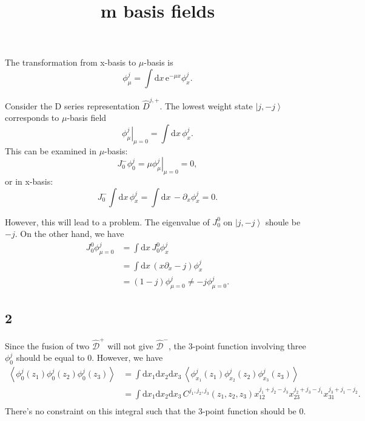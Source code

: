 \documentclass[10pt,a4paper]{article}
\numberwithin{equation}{section}
\newcommand{\ket}[1]{\left| #1 \right\rangle}
\newcommand{\vev}[1]{\left< #1 \right>}
\begin{document}
\title{m basis fields}
\maketitle

The transformation from x-basis to $\mu$-basis is 
\begin{equation}
    \phi^{j}_{\mu} = \int \mathrm{d} x \, \mathrm{e}^{- \mu x} \phi^{j}_{x}.
\end{equation}

Consider the D series representation $\hat{D}^{j,+}$. The lowest weight state $\ket{j, -j}$ corresponds to $\mu$-basis field 
\begin{equation}
    \left.\phi^{j}_{\mu}\right|_{\mu = 0} = \int \mathrm{d} x \, \phi^{j}_{x}.
\end{equation}
This can be examined in $\mu$-basis: 
\begin{equation}
    J^{-}_{0} \phi^{j}_{ 0} = \left.\mu \phi^{j}_{\mu}\right|_{\mu = 0} = 0,
\end{equation}
or in x-basis:
\begin{equation}
    J^{-}_{0} \int \mathrm{d} x \, \phi^{j}_{x} = \int \mathrm{d} x \, - \partial_{x} \phi^{j}_{x} = 0.
\end{equation}

However, this will lead to a problem. The eigenvalue of $J^{0}_{0}$ on $\ket{j, -j}$ shoule be $-j$. On the other hand, we have 
\begin{align}
    J^{0}_{0} \phi^{j}_{\mu = 0} & = \int \mathrm{d} x \, J^{0}_{0} \phi^{j}_{x} \\
                                 & = \int \mathrm{d} x \, (x\partial_{x} - j) \phi^{j}_{x}\\
                                 & = (1-j) \phi^{j}_{\mu = 0} \neq -j \phi^{j}_{\mu = 0}.
\end{align}

\subsection*{2}
Since the fusion of two $\hat{\mathcal{D}}^{+}$ will not give $\hat{\mathcal{D}}^{-}$, the 3-point function involving three $\phi^{j}_{0}$
should be equal to 0. However, we have 
\begin{align}
    \vev{\phi^{j}_{0}(z_{1})\phi^{j}_{0}(z_{2})\phi^{j}_{0}(z_{3})} & = \int \mathrm{d} x_{1} \mathrm{d} x_{2} \mathrm{d} x_{3} \, \vev{\phi^{j}_{x_{1}}(z_{1})\phi^{j}_{x_{2}}(z_{2})\phi^{j}_{x_{3}}(z_{3})} \\
    & = \int \mathrm{d} x_{1} \mathrm{d} x_{2} \mathrm{d} x_{3} \, C^{j_{1},j_{2},j_{3}}(z_{1},z_{2},z_{3}) x_{12}^{j_{1}+j_{2}-j_{3}} x_{23}^{j_{2}+j_{3}-j_{1}} x_{31}^{j_{3}+j_{1}-j_{2}}.   \\
\end{align}
There's no constraint on this integral such that the 3-point function should be 0.
\end{document}
